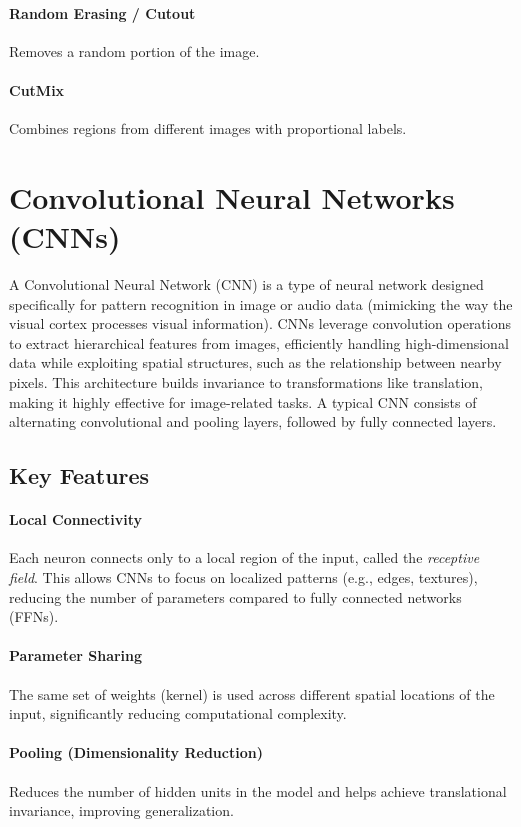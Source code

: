 \documentclass{article}
\begin{document}
\paragraph{Random Erasing / Cutout} Removes a random portion of the image.

\paragraph{CutMix} Combines regions from different images with proportional labels.

\clearpage\newpage

\section{Convolutional Neural Networks (CNNs)} \label{sec:cnn}
A Convolutional Neural Network (CNN) is a type of neural network designed specifically for pattern recognition in image or audio data (mimicking the way the visual cortex processes visual information). CNNs leverage convolution operations to extract hierarchical features from images, efficiently handling high-dimensional data while exploiting spatial structures, such as the relationship between nearby pixels. This architecture builds invariance to transformations like translation, making it highly effective for image-related tasks. A typical CNN consists of alternating convolutional and pooling layers, followed by fully connected layers.

\subsection{Key Features}
\paragraph{Local Connectivity} Each neuron connects only to a local region of the input, called the \textit{receptive field}. This allows CNNs to focus on localized patterns (e.g., edges, textures), reducing the number of parameters compared to fully connected networks (FFNs).

\paragraph{Parameter Sharing} The same set of weights (kernel) is used across different spatial locations of the input, significantly reducing computational complexity.
\paragraph{Pooling (Dimensionality Reduction)} Reduces the number of hidden units in the model and helps achieve translational invariance, improving generalization.
\end{document}
